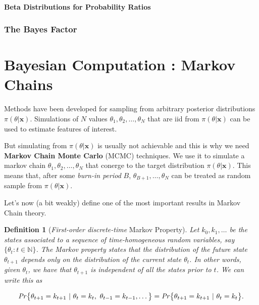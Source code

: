 \documentclass[11pt,a4paper,openany ]{book}
\newtheorem{definition}{Definition}[chapter]
\begin{document}
\paragraph*{Beta Distributions for Probability Ratios}



\subsubsection*{The Bayes Factor}




\section{Bayesian Computation : Markov Chains}


Methods have been developed for sampling from arbitrary posterior distributions $\pi(\theta|\boldsymbol{x})$. Simulations of $N$ values $\theta_1,\theta_2,\dots,\theta_N$ that are iid from $\pi(\theta|\boldsymbol{x})$ can be used to estimate features of interest.

But simulating from $\pi(\theta|\boldsymbol{x})$ is usually not achievable and this is why we need \textbf{Markov Chain Monte Carlo} (MCMC) techniques. 
We use it to simulate a markov chain $\theta_1,\theta_2,\dots,\theta_N$ that conerge to the target distribution $\pi(\theta|\boldsymbol{x})$.
This means that, after some \emph{burn-in period} $B$, $\theta_{B+1},\dots,\theta_N$ can be treated as random sample from $\pi(\theta|\boldsymbol{x})$.


Let's now (a bit weakly) define one of the most important results in Markov Chain theory.

\begin{definition}[\emph{First-order discrete-time} Markov Property]
	Let $k_0,k_1,\dots$ be the states associated to a sequence of time-homogeneous random variables, say $\big\{\theta_t:t\in\mathbb{N}\big\}$.
	The Markov property states that the distribution of the future state $\theta_{t+1}$ depends only on the distribution of the current state $\theta_{t}$. 
	In other words, given $\theta_{t}$, we have that $\theta_{t+1}$ is independent of all the states prior to $t$. We can write this as
	
	\begin{equation}
	\text{\emph{Pr}}\big\{\theta_{t+1}=k_{t+1}\ |\ \theta_t=k_t,\ \theta_{t-1}=k_{t-1},\dots\big\} = \text{\emph{Pr}}\big\{\theta_{t+1}=k_{t+1}\ | \ \theta_t=k_t\big\}.
	\end{equation}
\end{definition} 
\end{document}
